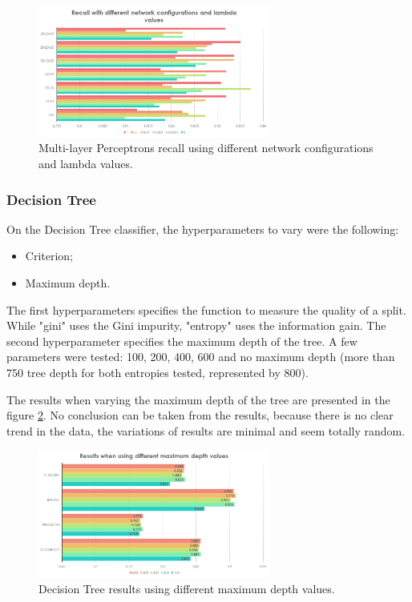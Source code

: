 \documentclass[journal]{IEEEtran}
\begin{document}
\begin{figure}[!t]
\centering
\includegraphics[width=3in]{nn3_w}
\caption{Multi-layer Perceptrons recall using different network configurations and lambda values.}
\label{nnresultsfixednetworkvaryinglambda}
\end{figure}

\subsubsection{Decision Tree}
On the Decision Tree classifier, the hyperparameters to vary were the following:
\begin{itemize}
\item Criterion;
\item Maximum depth.
\end{itemize}

The first hyperparameters specifies the function to measure the quality of a split. While "gini" uses the Gini impurity, "entropy" uses the information gain.
The second hyperparameter specifies the maximum depth of the tree. A few parameters were tested: 100, 200, 400, 600 and no maximum depth (more than 750 tree depth for both entropies tested, represented by 800).

The results when varying the maximum depth of the tree are presented in the figure \ref{dtvaryingdepth}. No conclusion can be taken from the results, because there is no clear trend in the data, the variations of results are minimal and seem totally random.

\begin{figure}[!t]
\centering
\includegraphics[width=3in]{dt1_w}
\caption{Decision Tree results using different maximum depth values.}
\label{dtvaryingdepth}
\end{figure}
\end{document}
